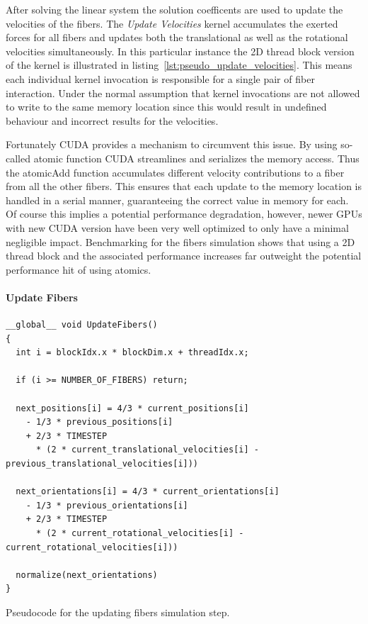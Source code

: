 \documentclass[a4paper,11pt]{kth-mag}
\begin{document}
After solving the linear system the solution coefficents are used to update the velocities of the fibers. The \emph{Update Velocities} kernel accumulates the exerted forces for all fibers and updates both the translational as well as the rotational velocities simultaneously. In this particular instance the 2D thread block version of the kernel is illustrated in listing~\ref{lst:pseudo_update_velocities}. This means each individual kernel invocation is responsible for a single pair of fiber interaction. Under the normal assumption that kernel invocations are not allowed to write to the same memory location since this would result in undefined behaviour and incorrect results for the velocities.

Fortunately CUDA provides a mechanism to circumvent this issue. By using so-called atomic function CUDA streamlines and serializes the memory access. Thus the atomicAdd function accumulates different velocity contributions to a fiber from all the other fibers. This ensures that each update to the memory location is handled in a serial manner, guaranteeing the correct value in memory for each. Of course this implies a potential performance degradation, however, newer GPUs with new CUDA version have been very well optimized to only have a minimal negligible impact. Benchmarking for the fibers simulation shows that using a 2D thread block and the associated performance increases far outweight the potential performance hit of using atomics.

\paragraph{Update Fibers}

\begin{listing}
  \centering
  \begin{verbatim}
__global__ void UpdateFibers()
{
  int i = blockIdx.x * blockDim.x + threadIdx.x;

  if (i >= NUMBER_OF_FIBERS) return;

  next_positions[i] = 4/3 * current_positions[i]
    - 1/3 * previous_positions[i]
    + 2/3 * TIMESTEP
      * (2 * current_translational_velocities[i] - previous_translational_velocities[i]))

  next_orientations[i] = 4/3 * current_orientations[i]
    - 1/3 * previous_orientations[i]
    + 2/3 * TIMESTEP
      * (2 * current_rotational_velocities[i] - current_rotational_velocities[i]))

  normalize(next_orientations)
}
  \end{verbatim}
  \caption{Pseudocode for the updating fibers simulation step.}
  \label{lst:pseudo_update_fibers}
\end{listing}
\end{document}
